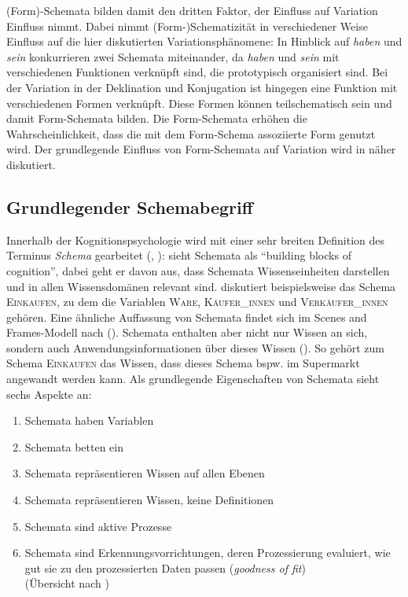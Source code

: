 (Form)-Schemata bilden damit den dritten Faktor, der Einfluss auf Variation Einfluss nimmt. Dabei nimmt (Form-)Schematizität in verschiedener Weise Einfluss auf die hier diskutierten Variationsphänomene: In Hinblick auf \textit{haben} und \textit{sein} konkurrieren zwei Schemata miteinander, da \textit{haben} und \textit{sein} mit verschiedenen Funktionen verknüpft sind, die prototypisch organisiert sind. Bei der Variation in der Deklination und Konjugation ist hingegen eine Funktion mit verschiedenen Formen verknüpft. Diese Formen können teilschematisch sein und damit Form-Schemata bilden. Die Form-Schemata erhöhen die Wahrscheinlichkeit, dass die mit dem Form-Schema assoziierte Form genutzt wird. Der grundlegende Einfluss von Form-Schemata auf Variation wird in  näher diskutiert.

\subsection{Grundlegender Schemabegriff}
\label{kognition}

Innerhalb der Kognitionspsychologie wird mit einer sehr breiten Definition des Terminus \textit{Schema} gearbeitet (\cite{Rumelhart.1980}, \cite[25--26]{Barlow.1994}): \textcite[33]{Rumelhart.1980} sieht Schemata als "`building blocks of cognition"', dabei geht er davon aus, dass Schemata Wissenseinheiten darstellen und in allen Wissensdomänen relevant sind. \textcite{Rumelhart.1980} diskutiert beispielsweise das Schema \textsc{Einkaufen}, zu dem die Variablen \textsc{Ware}, \textsc{Käufer\_innen} und \textsc{Ver\-käu\-\mbox{fer\_in}\-nen }gehören. Eine ähnliche Auffassung von Schemata findet sich im Scenes and Frames-Modell nach \textcite{Fillmore.1977} (\cite[448--449]{Bucker.2015}). Schemata enthalten aber nicht nur Wissen an sich, sondern auch Anwendungsinformationen über dieses Wissen (\cite[34]{Rumelhart.1980}). So gehört zum Schema \textsc{Einkaufen} das Wissen, dass dieses Schema bspw. im Supermarkt angewandt werden kann. Als grundlegende Eigenschaften von Schemata sieht \textcite[34--41]{Rumelhart.1980} sechs Aspekte an:\pagebreak

\begin{enumerate}
\item Schemata haben Variablen
\item	Schemata betten ein
\item	Schemata repräsentieren Wissen auf allen Ebenen
\item Schemata repräsentieren Wissen, keine Definitionen
\item	Schemata sind aktive Prozesse
\item	Schemata sind Erkennungsvorrichtungen, deren Prozessierung evaluiert, wie gut sie zu den prozessierten Daten passen (\textit{goodness of fit})\\
(Übersicht nach \cite[26]{Barlow.1994})
\end{enumerate}

